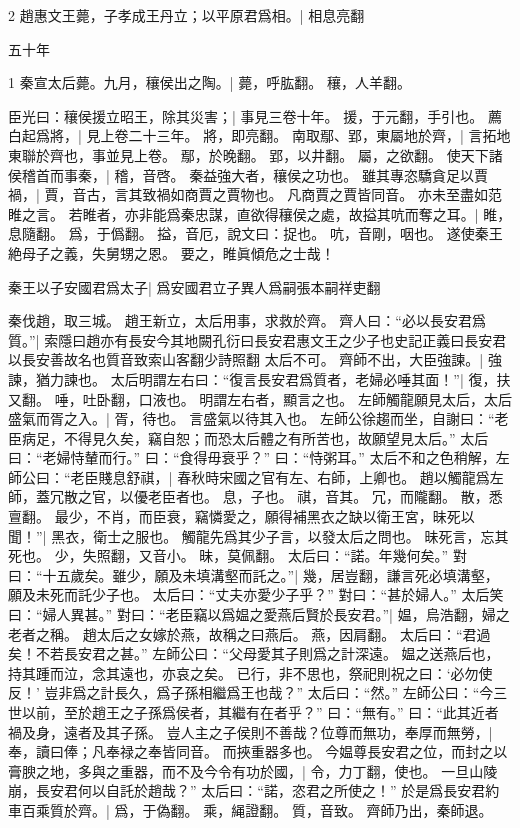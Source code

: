 2 趙惠文王薨，子孝成王丹立；以平原君爲相。|{
	相息亮翻
	}


五十年

1 秦宣太后薨。九月，穰侯出之陶。|{
	薨，呼肱翻。
	穰，人羊翻。
	}


臣光曰：穰侯援立昭王，除其災害；|{
	事見三卷十年。
	援，于元翻，手引也。
	}
薦白起爲將，|{
	見上卷二十三年。
	將，即亮翻。
	}
南取鄢、郢，東屬地於齊，|{
	言拓地東聯於齊也，事並見上卷。
	鄢，於晚翻。
	郢，以井翻。
	屬，之欲翻。
	}
使天下諸侯稽首而事秦，|{
	稽，音啓。
	}
秦益強大者，穰侯之功也。
雖其專恣驕貪足以賈禍，|{
	賈，音古，言其致禍如商賈之賈物也。
	凡商賈之賈皆同音。
	}
亦未至盡如范睢之言。
若睢者，亦非能爲秦忠謀，直欲得穰侯之處，故搤其吭而奪之耳。|{
	睢，息隨翻。
	爲，于僞翻。
	搤，音厄，說文曰：捉也。
	吭，音剛，咽也。
	}
遂使秦王絶母子之義，失舅甥之恩。
要之，睢眞傾危之士哉！

秦王以子安國君爲太子|{
	爲安國君立子異人爲嗣張本嗣祥吏翻}

秦伐趙，取三城。
趙王新立，太后用事，求救於齊。
齊人曰：“必以長安君爲質。”|{
	索隱曰趙亦有長安今其地闕孔衍曰長安君惠文王之少子也史記正義曰長安君以長安善故名也質音致索山客翻少詩照翻}
太后不可。
齊師不出，大臣強諫。|{
	強諫，猶力諫也。
	}
太后明謂左右曰：“復言長安君爲質者，老婦必唾其面！”|{
	復，扶又翻。
	唾，吐卧翻，口液也。
	明謂左右者，顯言之也。
	}
左師觸龍願見太后，太后盛氣而胥之入。|{
	胥，待也。
	言盛氣以待其入也。
	}
左師公徐趨而坐，自謝曰：“老臣病足，不得見久矣，竊自恕；而恐太后體之有所苦也，故願望見太后。”
太后曰：“老婦恃輦而行。”
曰：“食得毋衰乎？”
曰：“恃粥耳。”
太后不和之色稍解，左師公曰：“老臣賤息舒祺，|{
	春秋時宋國之官有左、右師，上卿也。
	趙以觸龍爲左師，蓋冗散之官，以優老臣者也。
	息，子也。
	祺，音其。
	冗，而隴翻。
	散，悉亶翻。
	}
最少，不肖，而臣衰，竊憐愛之，願得補黑衣之缺以衛王宮，昧死以聞！”|{
	黑衣，衛士之服也。
	觸龍先爲其少子言，以發太后之問也。
	昧死言，忘其死也。
	少，失照翻，又音小。
	昧，莫佩翻。
	}
太后曰：“諾。年幾何矣。”
對曰：“十五歲矣。雖少，願及未填溝壑而託之。”|{
	幾，居豈翻，謙言死必填溝壑，願及未死而託少子也。
	}
太后曰：“丈夫亦愛少子乎？”
對曰：“甚於婦人。”
太后笑曰：“婦人異甚。”
對曰：“老臣竊以爲媪之愛燕后賢於長安君。”|{
	媪，烏浩翻，婦之老者之稱。
	趙太后之女嫁於燕，故稱之曰燕后。
	燕，因肩翻。
	}
太后曰：“君過矣！不若長安君之甚。”
左師公曰：“父母愛其子則爲之計深遠。
	媪之送燕后也，持其踵而泣，念其遠也，亦哀之矣。
	已行，非不思也，祭祀則祝之曰：‘必勿使反！’
	豈非爲之計長久，爲子孫相繼爲王也哉？”
太后曰：“然。”
左師公曰：“今三世以前，至於趙王之子孫爲侯者，其繼有在者乎？”
曰：“無有。”
曰：“此其近者禍及身，遠者及其子孫。
豈人主之子侯則不善哉？位尊而無功，奉厚而無勞，|{
	奉，讀曰俸；凡奉禄之奉皆同音。
	}
而挾重器多也。
今媪尊長安君之位，而封之以膏腴之地，多與之重器，而不及今令有功於國，|{
	令，力丁翻，使也。
	}
一旦山陵崩，長安君何以自託於趙哉？”
太后曰：“諾，恣君之所使之！”
於是爲長安君約車百乘質於齊。|{
	爲，于偽翻。
	乘，䋲證翻。
	質，音致。
	}
齊師乃出，秦師退。

